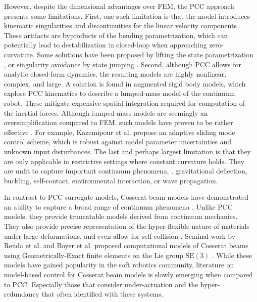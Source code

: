 However, despite the dimensional advantages over FEM, the PCC approach presents some limitations. First, one such limitation is that the model introduces kinematic singularities and discontinuities for the linear velocity components \cite{Jones2006, Jones2007Apr}. These artifacts are byproducts of the bending parametrization, which can potentially lead to destabilization in closed-loop when approaching zero-curvature. Some solutions have been proposed by lifting the state parametrization \cite{DellaSantina2020Jan}, or singularity avoidance by state jumping \cite{Falkenhahn2015,Tatlicioglu2007}. Second, although PCC allows for analytic closed-form dynamics, the resulting models are highly nonlinear, complex, and large. A solution is found in augmented rigid body models, which explore PCC kinematics to describe a lumped-mass model of the continuum robot. These mitigate expensive spatial integration required for computation of the inertial forces. Although lumped-mass models are seemingly an oversimplification compared to FEM, such models have proven to be rather effective \cite{DellaSantina2020, Kazemipour2022May, Katzschmann2019,Franco2020,Franco2022}. For example, Kazemipour et al. \cite{Kazemipour2022May} propose an adaptive sliding mode control scheme, which is robust against model parameter uncertainties and unknown input disturbances. The last and perhaps largest limitation is that they are only applicable in restrictive settings where constant curvature holds. They are unfit to capture important continuum phenomena, \eg, gravitational deflection, buckling, self-contact, environmental interaction, or wave propagation.

In contrast to PCC surrogate models, Cosserat beam-models have demonstrated an ability to capture a broad range of continuum phenomena \cite{Gazzola2018,Renda2017Aug,Renda2018,Boyer2010,Till2019}. Unlike PCC models, they provide truncatable models derived from continuum mechanics. They also provide precise representation of the hyper-flexible nature of materials under large deformations, and even allow for self-collision \cite{Gazzola2018}. Seminal work by Renda et al. \cite{Renda2018,Renda2020} and Boyer et al. \cite{Boyer2021} proposed computational models of Cosserat beams using Geometrically-Exact finite elements on the Lie group $\textrm{SE}(3)$ \cite{Simo1986}. While these models have gained popularity in the soft robotics community, literature on model-based control for Cosserat beam models is slowly emerging when compared to PCC. Especially those that consider under-actuation and the hyper-redundancy that often identified with these systems.
